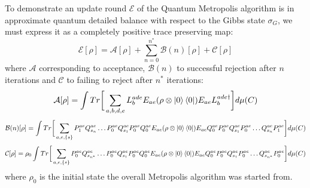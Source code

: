 \documentclass[aps,floatfix,10pt,amssymb,amsfont,amsmath,superscriptaddress,float,nofootinbib,longbibliography,nobalancelastpage,twocolumn]{revtex4-2}
\newtheorem{corollary}{Corollary}
\begin{document}
\begin{widetext}
To demonstrate an update round $\mathcal{E}$ of the Quantum Metropolis algorithm is in approximate quantum detailed balance with respect to the Gibbs state $\sigma_G$, we must express it as a completely positive trace preserving map:
\begin{equation}
    \mathcal{E}[\rho] = \mathcal{A}[\rho] + \sum_{n=0}^{n^*} \mathcal{B}(n)[\rho] + \mathcal{C}[\rho]
\end{equation}
where $\mathcal{A}$ corresponding to acceptance, $\mathcal{B}(n)$ to successful rejection after $n$ iterations and $\mathcal{C}$ to failing to reject after $n^*$ iterations:
\begin{equation}
    \mathcal{A}[\rho] = \int  Tr\bigg[\sum_{a,b,d,e}L_b^{ade} E_{ae} ( \rho\otimes \ket{0}\bra{0}) 
     E_{ae}L^{ade\dagger}_b\bigg]d\mu(C)
\end{equation}
\begin{equation}
    \mathcal{B}(n)[\rho] = \int Tr\bigg[\sum_{a,e,\{s\}}P^{ae}_1Q^{ae}_{s_n}\ldots P^{ae}_0Q^{ae}_{s_1}P^{ae}_0Q^{ae}_0E_{ae} ( \rho\otimes \ket{0}\bra{0})E_{ae}Q^{ae}_0P^{ae}_0Q^{ae}_{s_1}P^{ae}_0\ldots Q^{ae}_{s_n}P^{ae}_1\bigg]d\mu(C)
\end{equation}
\begin{equation}
    \mathcal{C}[\rho] = \rho_0 \int Tr\bigg[\sum_{a,e,\{s\}}P^{ae}_0Q^{ae}_{s_{n^*}}\ldots P^{ae}_0Q^{ae}_{s_1}P^{ae}_0Q^{ae}_0E_{ae} ( \rho\otimes \ket{0}\bra{0})E_{ae}Q^{ae}_0P^{ae}_0Q^{ae}_{s_1}P^{ae}_0\ldots Q^{ae}_{s_{n^*}}P^{ae}_0\bigg]d\mu(C) 
\end{equation}
where $\rho_0$ is the initial state the overall Metropolis algorithm was started from. 



\end{widetext}
\end{document}
